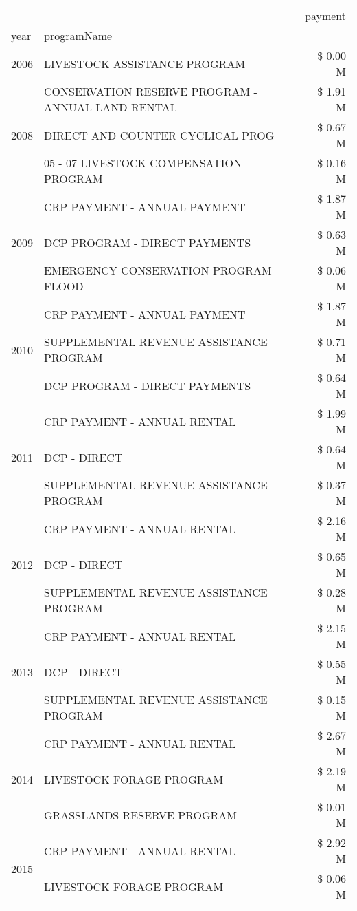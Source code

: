 \begin{tabular}{llr}
\toprule
 &  & payment \\
year & programName &  \\
\midrule
2006 & LIVESTOCK ASSISTANCE PROGRAM & \$ 0.00 M \\
\cline{1-3}
\multirow[t]{3}{*}{2008} & CONSERVATION RESERVE PROGRAM - ANNUAL LAND RENTAL & \$ 1.91 M \\
 & DIRECT AND COUNTER CYCLICAL PROG & \$ 0.67 M \\
 & 05 - 07 LIVESTOCK COMPENSATION PROGRAM & \$ 0.16 M \\
\cline{1-3}
\multirow[t]{3}{*}{2009} & CRP PAYMENT - ANNUAL PAYMENT & \$ 1.87 M \\
 & DCP PROGRAM - DIRECT PAYMENTS & \$ 0.63 M \\
 & EMERGENCY CONSERVATION PROGRAM - FLOOD & \$ 0.06 M \\
\cline{1-3}
\multirow[t]{3}{*}{2010} & CRP PAYMENT - ANNUAL PAYMENT & \$ 1.87 M \\
 & SUPPLEMENTAL REVENUE ASSISTANCE PROGRAM & \$ 0.71 M \\
 & DCP PROGRAM - DIRECT PAYMENTS & \$ 0.64 M \\
\cline{1-3}
\multirow[t]{3}{*}{2011} & CRP PAYMENT - ANNUAL RENTAL & \$ 1.99 M \\
 & DCP - DIRECT & \$ 0.64 M \\
 & SUPPLEMENTAL REVENUE ASSISTANCE PROGRAM & \$ 0.37 M \\
\cline{1-3}
\multirow[t]{3}{*}{2012} & CRP PAYMENT - ANNUAL RENTAL & \$ 2.16 M \\
 & DCP - DIRECT & \$ 0.65 M \\
 & SUPPLEMENTAL REVENUE ASSISTANCE PROGRAM & \$ 0.28 M \\
\cline{1-3}
\multirow[t]{3}{*}{2013} & CRP PAYMENT - ANNUAL RENTAL & \$ 2.15 M \\
 & DCP - DIRECT & \$ 0.55 M \\
 & SUPPLEMENTAL REVENUE ASSISTANCE PROGRAM & \$ 0.15 M \\
\cline{1-3}
\multirow[t]{3}{*}{2014} & CRP PAYMENT - ANNUAL RENTAL & \$ 2.67 M \\
 & LIVESTOCK FORAGE PROGRAM & \$ 2.19 M \\
 & GRASSLANDS RESERVE PROGRAM & \$ 0.01 M \\
\cline{1-3}
\multirow[t]{3}{*}{2015} & CRP PAYMENT - ANNUAL RENTAL & \$ 2.92 M \\
 & LIVESTOCK FORAGE PROGRAM & \$ 0.06 M \\

\end{tabular}

